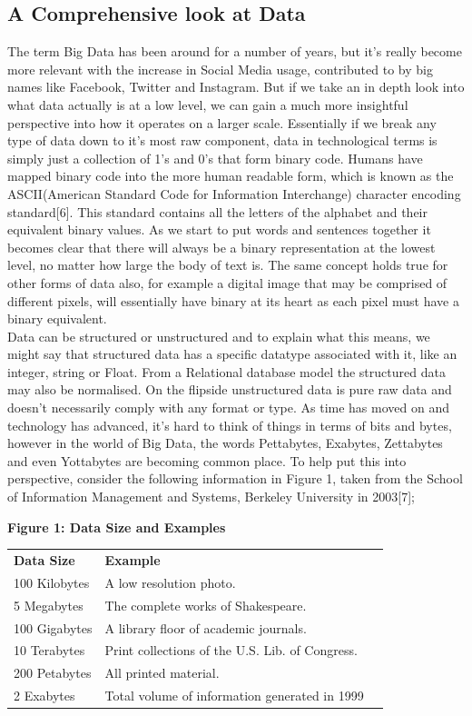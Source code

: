 \documentclass[10pt,journal,compsoc]{IEEEtran}
\begin{document}
\subsection{A Comprehensive look at Data}
The term Big Data has been around for a number of years, but it's really become more relevant with the increase in Social Media usage, contributed to by big names like Facebook, Twitter and Instagram. But if we take an in depth look into what data actually is at a low level, we can gain a much more insightful perspective into how it operates on a larger scale. Essentially if we break any type of data down to it's most raw component, data in technological terms is simply just a collection of 1's and 0's that form binary code. Humans have mapped binary code into the more human readable form, which is known as the ASCII(American Standard Code for Information Interchange) character encoding standard[6]. This standard contains all the letters of the alphabet and their equivalent binary values. As we start to put words and sentences together it becomes clear that there will always be a binary representation at the lowest level, no matter how large the body of text is. The same concept holds true for other forms of data also, for example a digital image that may be comprised of different pixels, will essentially have binary at its heart as each pixel must have a binary equivalent. \\  Data can be structured or unstructured and to explain what this means, we might say that structured data has a specific datatype associated with it, like an integer, string or Float. From a Relational database model the structured data may also be normalised. On the flipside unstructured data is pure raw data and doesn't necessarily comply with any format or type. As time has moved on and technology has advanced, it's hard to think of things in terms of bits and bytes, however in the world of Big Data, the words Pettabytes, Exabytes, Zettabytes and even Yottabytes are becoming common place. To help put this into perspective, consider the following information in Figure 1, taken from the School of Information Management and Systems, Berkeley University in 2003[7];\\

\begin{algoBox}{\textbf{Figure 1: Data Size and Examples}}
	\begin{tabular}{lp{}r}
		\bfseries Data Size & \bfseries Example &
		\bfseries  \\[1ex]
		100 Kilobytes & A low resolution photo. \\
		5 Megabytes & The complete works of Shakespeare. \\
		100 Gigabytes & A library floor of academic journals. \\
		10 Terabytes & Print collections of the U.S. Lib. of Congress. \\
		200 Petabytes & All printed material. \\
		2 Exabytes & Total volume of information generated in 1999
	\end{tabular}\\\\\\
\end{algoBox}
\end{document}
